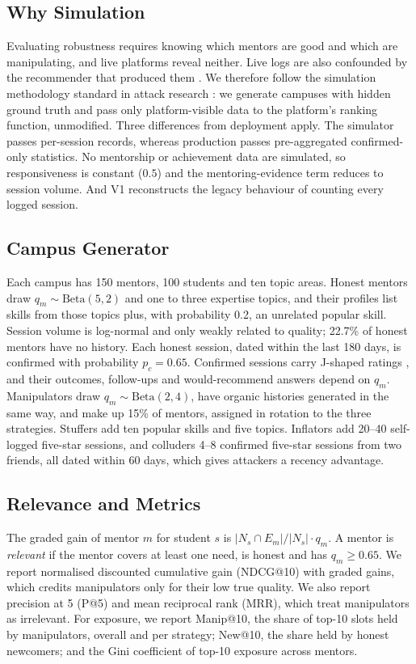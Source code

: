 \documentclass[conference]{IEEEtran}
\begin{document}
\subsection{Why Simulation}
Evaluating robustness requires knowing which mentors are good and which are manipulating, and live platforms reveal neither. Live logs are also confounded by the recommender that produced them \cite{chaney2018}. We therefore follow the simulation methodology standard in attack research \cite{mobasher2007}: we generate campuses with hidden ground truth and pass only platform-visible data to the platform's ranking function, unmodified. Three differences from deployment apply. The simulator passes per-session records, whereas production passes pre-aggregated confirmed-only statistics. No mentorship or achievement data are simulated, so responsiveness is constant ($0.5$) and the mentoring-evidence term reduces to session volume. And V1 reconstructs the legacy behaviour of counting every logged session.

\subsection{Campus Generator}
Each campus has 150 mentors, 100 students and ten topic areas. Honest mentors draw $q_m\sim\mathrm{Beta}(5,2)$ and one to three expertise topics, and their profiles list skills from those topics plus, with probability 0.2, an unrelated popular skill. Session volume is log-normal and only weakly related to quality; 22.7\% of honest mentors have no history. Each honest session, dated within the last 180 days, is confirmed with probability $p_c=0.65$. Confirmed sessions carry J-shaped ratings \cite{hu2006}, and their outcomes, follow-ups and would-recommend answers depend on $q_m$. Manipulators draw $q_m\sim\mathrm{Beta}(2,4)$, have organic histories generated in the same way, and make up 15\% of mentors, assigned in rotation to the three strategies. Stuffers add ten popular skills and five topics. Inflators add 20--40 self-logged five-star sessions, and colluders 4--8 confirmed five-star sessions from two friends, all dated within 60 days, which gives attackers a recency advantage.

\subsection{Relevance and Metrics}
The graded gain of mentor $m$ for student $s$ is $|N_s\cap E_m|/|N_s|\cdot q_m$. A mentor is \emph{relevant} if the mentor covers at least one need, is honest and has $q_m\ge0.65$. We report normalised discounted cumulative gain (NDCG@10) \cite{jarvelin2002} with graded gains, which credits manipulators only for their low true quality. We also report precision at 5 (P@5) and mean reciprocal rank (MRR), which treat manipulators as irrelevant. For exposure, we report Manip@10, the share of top-10 slots held by manipulators, overall and per strategy; New@10, the share held by honest newcomers; and the Gini coefficient of top-10 exposure across mentors.
\end{document}
